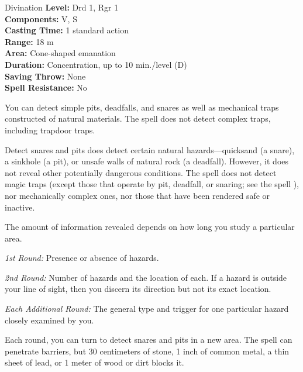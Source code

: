 {Divination}
{
	\textbf{Level:}
	Drd 1, Rgr 1\\
	\textbf{Components:}
	V, S\\
	\textbf{Casting Time:}
	1 standard action\\
	\textbf{Range:}
	18 m\\
	\textbf{Area:}
	Cone-shaped emanation\\
	\textbf{Duration:}
	Concentration, up to 10 min./level (D)\\
	\textbf{Saving Throw:}
	None\\
	\textbf{Spell Resistance:}
	No\\
}
{
	You can detect simple pits, deadfalls, and snares as well as mechanical traps constructed of natural materials. The spell does not detect complex traps, including trapdoor traps.

	Detect snares and pits does detect certain natural hazards---quicksand (a snare), a sinkhole (a pit), or unsafe walls of natural rock (a deadfall). However, it does not reveal other potentially dangerous conditions. The spell does not detect magic traps (except those that operate by pit, deadfall, or snaring; see the spell ), nor mechanically complex ones, nor those that have been rendered safe or inactive.

	The amount of information revealed depends on how long you study a particular area.

	\textit{1st Round:}
	Presence or absence of hazards.

	\textit{2nd Round:}
	Number of hazards and the location of each. If a hazard is outside your line of sight, then you discern its direction but not its exact location.

	\textit{Each Additional Round:}
	The general type and trigger for one particular hazard closely examined by you.

	Each round, you can turn to detect snares and pits in a new area. The spell can penetrate barriers, but 30 centimeters of stone, 1 inch of common metal, a thin sheet of lead, or 1 meter of wood or dirt blocks it.

}
